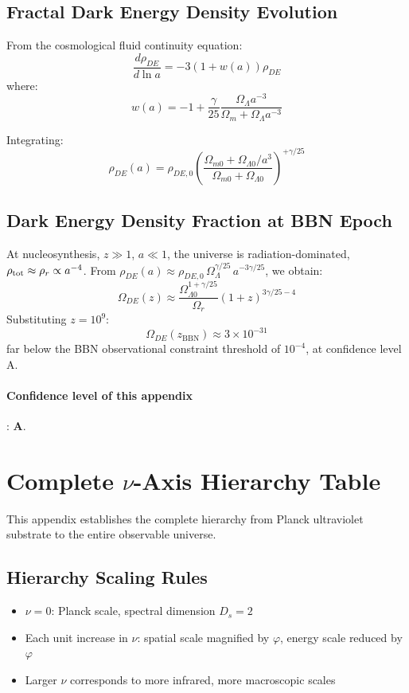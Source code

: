 \documentclass[12pt,a4paper,twocolumn]{article}
\renewcommand{\phi}{\varphi}
\begin{document}
\subsection{Fractal Dark Energy Density Evolution}
From the cosmological fluid continuity equation:
\[
\frac{d\rho_{DE}}{d\ln a} = -3(1+w(a))\rho_{DE}
\]
where:
\[
w(a) = -1 + \frac{\gamma}{25} \frac{\Omega_\Lambda a^{-3}}{\Omega_m + \Omega_\Lambda a^{-3}}
\]

Integrating:
\[
\rho_{DE}(a) = \rho_{DE,0} \left( \frac{\Omega_{m0} + \Omega_{\Lambda0}/a^3}{\Omega_{m0} + \Omega_{\Lambda0}} \right)^{+\gamma/25}
\]

\subsection{Dark Energy Density Fraction at BBN Epoch}
At nucleosynthesis, $z\gg1$, $a\ll1$, the universe is radiation-dominated, $\rho_{\rm tot}\approx\rho_r\propto a^{-4}$. From $\rho_{DE}(a)\approx\rho_{DE,0}\,\Omega_\Lambda^{\gamma/25}\,a^{-3\gamma/25}$, we obtain:
\[
\Omega_{DE}(z) \approx \frac{\Omega_{\Lambda0}^{1+\gamma/25}}{\Omega_r} (1+z)^{3\gamma/25-4}
\]
Substituting $z=10^9$:
\[
\Omega_{DE}(z_{\text{BBN}}) \approx 3\times 10^{-31}
\]
far below the BBN observational constraint threshold of $10^{-4}$, at confidence level A.

\paragraph{Confidence level of this appendix}: \textbf{A}.

\section{Complete $\nu$-Axis Hierarchy Table}
\label{app:nu_axis}

This appendix establishes the complete hierarchy from Planck ultraviolet substrate to the entire observable universe.

\subsection{Hierarchy Scaling Rules}
\begin{itemize}
\item $\nu=0$: Planck scale, spectral dimension $D_s=2$
\item Each unit increase in $\nu$: spatial scale magnified by $\phi$, energy scale reduced by $\phi$
\item Larger $\nu$ corresponds to more infrared, more macroscopic scales
\end{itemize}
\end{document}
